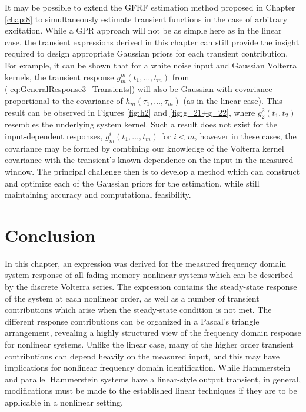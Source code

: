It may be possible to extend the GFRF estimation method proposed in Chapter \ref{chap:8} to simultaneously estimate transient functions in the case of arbitrary excitation. While a GPR approach will not be as simple here as in the linear case, the transient expressions derived in this chapter can still provide the insight required to design appropriate Gaussian priors for each transient contribution. For example, it can be shown that for a white noise input and Gaussian Volterra kernels, the transient response $g_m^m(t_1,\hdots,t_m)$ from (\ref{eq:GeneralResponse3_Transients}) will also be Gaussian with covariance proportional to the covariance of $h_m(\tau_1,\hdots,\tau_m)$ (as in the linear case). This result can be observed in Figures \ref{fig:h2} and \ref{fig:g_21+g_22}, where $g_2^2(t_1,t_2)$ resembles the underlying system kernel. Such a result does not exist for the input-dependent responses, $g_m^i(t_1,\hdots,t_m)$ for $i<m$, however in these cases, the covariance may be formed by combining our knowledge of the Volterra kernel covariance with the transient's known dependence on the input in the measured window. The principal challenge then is to develop a method which can construct and optimize each of the Gaussian priors for the estimation, while still maintaining accuracy and computational feasibility.

\section{Conclusion}

In this chapter, an expression was derived for the measured frequency domain system response of all fading memory nonlinear systems which can be described by the discrete Volterra series. The expression contains the steady-state response of the system at each nonlinear order, as well as a number of transient contributions which arise when the steady-state condition is not met. The different response contributions can be organized in a Pascal's triangle arrangement, revealing a highly structured view of the frequency domain response for nonlinear systems. Unlike the linear case, many of the higher order transient contributions can depend heavily on the measured input, and this may have implications for nonlinear frequency domain identification. While Hammerstein and parallel Hammerstein systems have a linear-style output transient, in general, modifications must be made to the established linear techniques if they are to be applicable in a nonlinear setting. 


